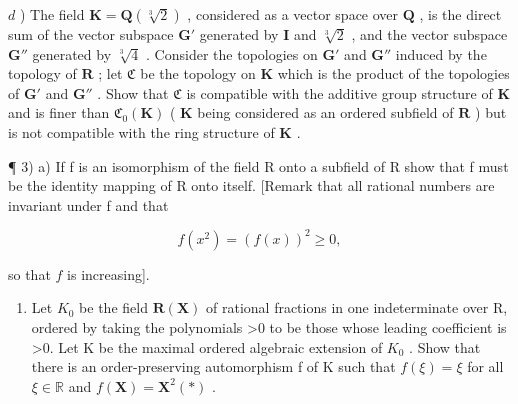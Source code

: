 \(d\) ) The field \(\mathbf{K} = \mathbf{Q}(\sqrt[3]{2})\) , considered as a vector space over \(\mathbf{Q}\) , is the direct sum of the vector subspace \(\mathbf{G}'\) generated by \(\mathbf{I}\) and \(\sqrt[3]{2}\) , and the vector subspace \(\mathbf{G}''\) generated by \(\sqrt[3]{4}\) . Consider the topologies on \(\mathbf{G}'\) and \(\mathbf{G}''\) induced by the topology of \(\mathbf{R}\) ; let \(\mathfrak{C}\) be the topology on \(\mathbf{K}\) which is the product of the topologies of \(\mathbf{G}'\) and \(\mathbf{G}''\) . Show that \(\mathfrak{C}\) is compatible with the additive group structure of \(\mathbf{K}\) and is finer than \(\mathfrak{C}_0(\mathbf{K})\) ( \(\mathbf{K}\) being considered as an ordered subfield of \(\mathbf{R}\) ) but is not compatible with the ring structure of \(\mathbf{K}\) .

¶ 3) a) If f is an isomorphism of the field R onto a subfield of R show that f must be the identity mapping of R onto itself. {[}Remark that all rational numbers are invariant under f and that

\[
f (x ^ {2}) = (f (x)) ^ {2} \geqslant 0,
\]

so that \(f\) is increasing{]}.

\begin{enumerate}
\def\labelenumi{\alph{enumi})}
\setcounter{enumi}{1}
\tightlist
\item
  Let \(K_{0}\) be the field \(\mathbf{R}(\mathbf{X})\) of rational fractions in one indeterminate over R, ordered by taking the polynomials \textgreater0 to be those whose leading coefficient is \textgreater0. Let K be the maximal ordered algebraic extension of \(K_{0}\) . Show that there is an order-preserving automorphism f of K such that \(f(\xi)=\xi\) for all \(\xi\in\mathbb{R}\) and \(f(\mathbf{X})=\mathbf{X}^{2}(*)\) .
\end{enumerate}

\BourbakiExerciseGroup

